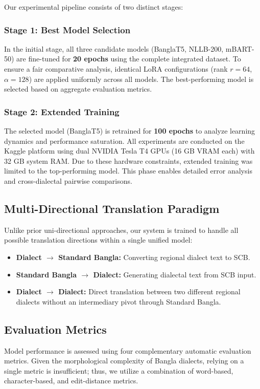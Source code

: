 \documentclass[12pt,a4paper]{article}
\begin{document}
Our experimental pipeline consists of two distinct stages:

\subsubsection{Stage 1: Best Model Selection}
In the initial stage, all three candidate models (BanglaT5, NLLB-200, mBART-50) are fine-tuned for \textbf{20 epochs} using the complete integrated dataset. To ensure a fair comparative analysis, identical LoRA configurations (rank $r = 64$, $\alpha = 128$) are applied uniformly across all models. The best-performing model is selected based on aggregate evaluation metrics.

\subsubsection{Stage 2: Extended Training}
The selected model (BanglaT5) is retrained for \textbf{100 epochs} to analyze learning dynamics and performance saturation. All experiments are conducted on the Kaggle platform using dual NVIDIA Tesla T4 GPUs (16 GB VRAM each) with 32 GB system RAM. Due to these hardware constraints, extended training was limited to the top-performing model. This phase enables detailed error analysis and cross-dialectal pairwise comparisons.

\subsection{Multi-Directional Translation Paradigm}
Unlike prior uni-directional approaches, our system is trained to handle all possible translation directions within a single unified model:
\begin{itemize}
    \item \textbf{Dialect $\rightarrow$ Standard Bangla:} Converting regional dialect text to SCB.
    \item \textbf{Standard Bangla $\rightarrow$ Dialect:} Generating dialectal text from SCB input.
    \item \textbf{Dialect $\rightarrow$ Dialect:} Direct translation between two different regional dialects without an intermediary pivot through Standard Bangla.
\end{itemize}

\subsection{Evaluation Metrics}
Model performance is assessed using four complementary automatic evaluation metrics. Given the morphological complexity of Bangla dialects, relying on a single metric is insufficient; thus, we utilize a combination of word-based, character-based, and edit-distance metrics.
\end{document}

